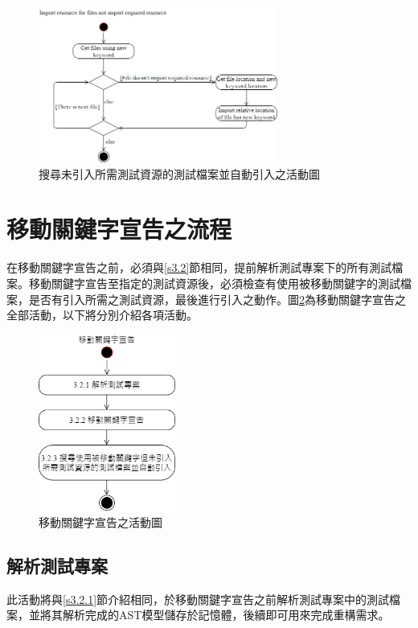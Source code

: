 \begin{figure}[H]
    \centering
    \includegraphics[width=0.7\textwidth]{picture/Import_resource_for_files_not_import_required_resource.png}
    \caption{搜尋未引入所需測試資源的測試檔案並自動引入之活動圖}
    \label{f3.5}
\end{figure}

\section{移動關鍵字宣告之流程}\label{s3.3}
\indent
在移動關鍵字宣告之前，必須與\ref{s3.2}節相同，提前解析測試專案下的所有測試檔案。移動關鍵字宣告至指定的測試資源後，必須檢查有使用被移動關鍵字的測試檔案，是否有引入所需之測試資源，最後進行引入之動作。圖\ref{f3.6}為移動關鍵字宣告之全部活動，以下將分別介紹各項活動。

\begin{figure}[H]
    \centering
    \includegraphics[width=0.4\textwidth]{picture/Move_definition_of_keyword.png}
    \caption{移動關鍵字宣告之活動圖}
    \label{f3.6}
\end{figure}

\subsection{解析測試專案}
\indent
此活動將與\ref{s3.2.1}節介紹相同，於移動關鍵字宣告之前解析測試專案中的測試檔案，並將其解析完成的AST模型儲存於記憶體，後續即可用來完成重構需求。

